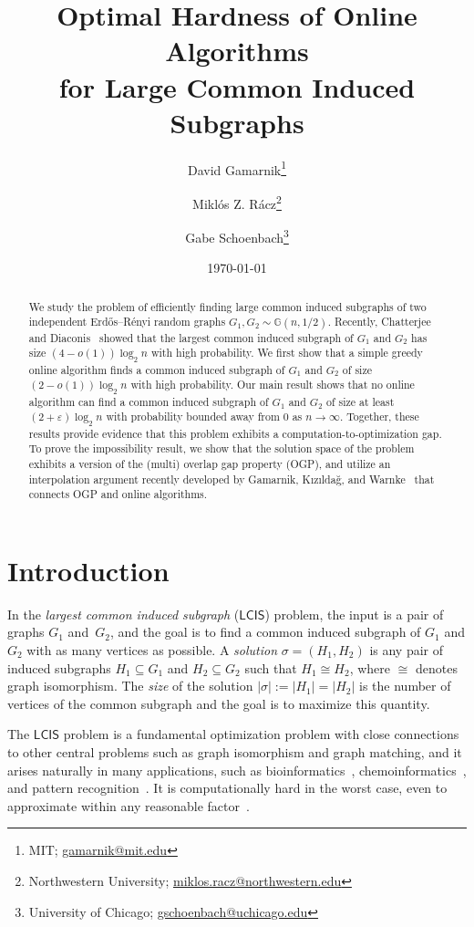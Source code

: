 \documentclass[11pt]{article}
\title{Optimal Hardness of Online Algorithms\\ for Large Common Induced Subgraphs}
\author{David Gamarnik\thanks{MIT; \url{gamarnik@mit.edu}}
\and Mikl\'os Z. R\'acz\thanks{Northwestern University; \url{miklos.racz@northwestern.edu}} 
\and Gabe Schoenbach\thanks{University of Chicago; \url{gschoenbach@uchicago.edu}}}
\date{\today}
\theoremstyle{plain}
\theoremstyle{definition}
\theoremstyle{remark}
\newcommand{\MCS}{\mathsf{LCIS}}
\begin{document}
\maketitle

\begin{abstract}
We study the problem of efficiently finding large common induced subgraphs of two independent Erd\H{o}s--R\'enyi random graphs $G_1, G_2 \sim \mathbb{G}(n,1/2)$. Recently, Chatterjee and Diaconis~\cite{CD23} showed that the largest common induced subgraph of $G_1$ and $G_2$ has size $(4-o(1))\log_2 n$ with high probability. We first show that a simple greedy online algorithm finds a common induced subgraph of $G_1$ and $G_2$ of size $(2-o(1)) \log_2 n$ with high probability. Our main result shows that no online algorithm can find a common induced subgraph of $G_1$ and $G_2$ of size at least $(2+\varepsilon) \log_2 n$ with probability bounded away from $0$ as $n \to \infty$. Together, these results provide evidence that this problem exhibits a computation-to-optimization gap. To prove the impossibility result, we show that the solution space of the problem exhibits a version of the (multi) overlap gap property (OGP), and utilize an interpolation argument recently developed by Gamarnik, K{\i}z{\i}lda\u{g}, and Warnke~\cite{GKW25} that connects OGP and online algorithms.  
\end{abstract}

\section{Introduction}
In the \emph{largest common induced subgraph} ($\MCS$) problem, the input is a pair of graphs $G_{1}$ and~$G_{2}$, 
and the goal is to find a common induced subgraph of $G_{1}$ and $G_{2}$ with as many vertices as possible. 
A \emph{solution} $\sigma = (H_1, H_2)$ is any pair of induced subgraphs $H_1 \subseteq G_1$ and $H_2 \subseteq G_2$ such that $H_1 \cong H_2$, where $\cong$ denotes graph isomorphism. The \emph{size} of the solution $|\sigma| := |H_1| = |H_2|$ is the number of vertices of the common subgraph and the goal is to maximize this quantity. 

The $\MCS$ problem is a fundamental optimization problem with close connections to other central problems such as graph isomorphism and graph matching, 
and it arises naturally in many applications, 
such as bioinformatics~\cite{ehrlich2011maximum}, chemoinformatics~\cite{schietgat2013polynomial}, and pattern recognition~\cite{conte2004thirty}. 
It is computationally hard in the worst case, even to approximate within any reasonable factor~\cite{kann1992approximability}.
\end{document}
